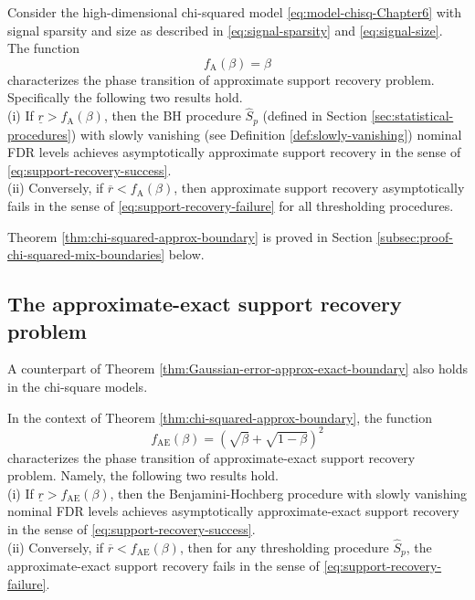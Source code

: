 \begin{theorem} \label{thm:chi-squared-approx-boundary}
Consider the high-dimensional chi-squared model \eqref{eq:model-chisq-Chapter6} with signal sparsity and size as described in \eqref{eq:signal-sparsity} and \eqref{eq:signal-size}.
The function 
\begin{equation} \label{eq:approx-boundary-chisquared}
    f_{\mathrm{A}}(\beta) = \beta
\end{equation}
characterizes the phase transition of approximate support recovery problem. Specifically the following two results hold.\\

{\rm (i)} If $\underline{r} > f_{\mathrm{A}}(\beta)$, then the \ac{BH} procedure $\widehat{S}_p$ (defined in Section \ref{sec:statistical-procedures}) with slowly vanishing (see Definition \ref{def:slowly-vanishing}) nominal FDR levels achieves asymptotically approximate support recovery in the sense of \eqref{eq:support-recovery-success}. \\

{\rm (ii)} Conversely, if $\overline{r} < f_{\mathrm{A}}(\beta)$, then approximate support recovery asymptotically fails in the sense of \eqref{eq:support-recovery-failure} for all thresholding procedures.
\end{theorem}

Theorem \ref{thm:chi-squared-approx-boundary} is proved in Section \ref{subsec:proof-chi-squared-mix-boundaries} below. 


\subsection{The approximate-exact support recovery problem}
\label{subsec:aprox-exact-support-recovery-chisq}

A counterpart of Theorem \ref{thm:Gaussian-error-approx-exact-boundary} also holds in the chi-square models.

\begin{theorem} \label{thm:chi-squared-approx-exact-boundary}
In the context of Theorem \ref{thm:chi-squared-approx-boundary}, the function 
\begin{equation} \label{eq:approx-exact-boundary-chisquared}
    f_{\mathrm{AE}}(\beta) = \left(\sqrt{\beta} + \sqrt{1-\beta}\right)^2
\end{equation}
characterizes the phase transition of approximate-exact support recovery problem. Namely, 
the following two results hold.\\

{\rm (i)} If $\underline{r} > f_{\mathrm{AE}}(\beta)$, then the Benjamini-Hochberg procedure with slowly vanishing nominal FDR levels achieves asymptotically approximate-exact support recovery in the sense of \eqref{eq:support-recovery-success}. \\

{\rm (ii)} Conversely, if $\overline{r} < f_{\mathrm{AE}}(\beta)$, then for any thresholding procedure $\widehat{S}_p$, the approximate-exact support recovery fails in the sense of \eqref{eq:support-recovery-failure}.
\end{theorem}


